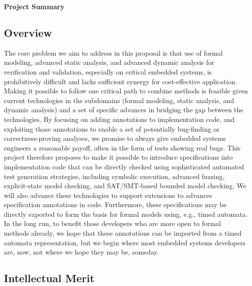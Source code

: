 \documentclass[11pt]{article}
\begin{document}

\begin{center}
  \large\bfseries
  Project Summary
\end{center}

\subsection*{Overview}

The core problem we aim to address in this proposal is that use of formal modeling, advanced static analysis, and advanced dynamic analysis for verification and validation, especially on critical embedded systems, is prohibitively difficult and lacks sufficient synergy for cost-effective application. Making it possible to follow one critical path to combine methods is feasible given current technologies in the subdomains (formal modeling, static analysis, and dynamic analysis) and a set of specific advances in bridging the gap between the technologies. By focusing on adding annotations to implementation code, and exploiting those annotations to enable a set of potentially bug-finding or correctness-proving analyses, we promise to always give embedded systems engineers a reasonable payoff, often in the form of tests showing real bugs. This project therefore proposes to make it possible to introduce specifications into implementation code that can be directly checked using sophisticated automated test generation strategies, including symbolic execution, advanced fuzzing, explicit-state model checking, and SAT/SMT-based bounded model checking. We will also advance these technologies %
to support extensions to advances specification annotations in code. Furthermore, these specifications may be directly exported to form the basis for formal models using, e.g., timed automata. In the long run, to benefit those developers who are more open to formal methods already, we hope that these annotations can be imported from a timed automata representation, but we begin where most embedded systems developers are, now, not where we hope they may be, someday.

\subsection*{Intellectual Merit}
\end{document}
